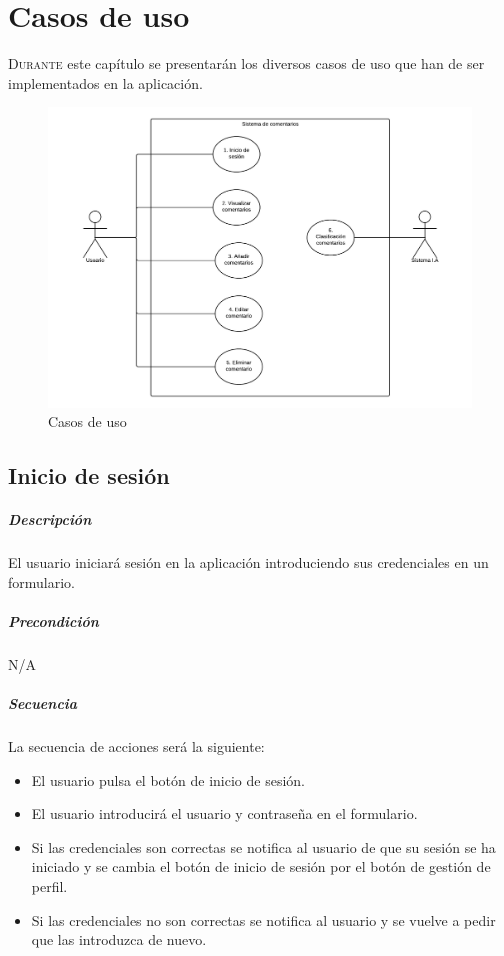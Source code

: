 
\chapter{Casos de uso}\label{chap:cu}

\lettrine{D}{urante} este capítulo se presentarán los diversos casos de uso que han de ser implementados en la aplicación.

\begin{figure}[!ht]
	\centering
	\includegraphics[width=1\textwidth]{imaxes/usecases.png}
	\caption{Casos de uso}
		\label{usecases}
\end{figure}

\section{Inicio de sesión}

\paragraph{Descripción} El usuario iniciará sesión en la aplicación introduciendo sus credenciales en un formulario.

\paragraph{Precondición} N/A

\paragraph{Secuencia} La secuencia de acciones será la siguiente:

\begin{itemize}
	\item El usuario pulsa el botón de inicio de sesión.
	\item El usuario introducirá el usuario y contraseña en el formulario.
	\item Si las credenciales son correctas se notifica al usuario de que su sesión se ha iniciado y se cambia el botón de inicio de sesión por el botón de gestión de perfil.
	\item Si las credenciales no son correctas se notifica al usuario y se vuelve a pedir que las introduzca de nuevo.
\end{itemize}

